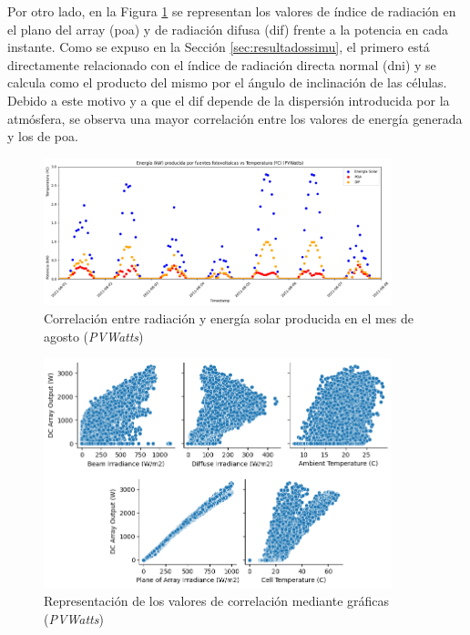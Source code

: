 Por otro lado, en la Figura \ref{fig:energiavsrad} se representan los valores de índice de radiación en el plano del array (\gls{poa}) y de radiación difusa (\gls{dif}) frente a la potencia en cada instante. Como se expuso en la Sección \ref{sec:resultadossimu}, el primero está directamente relacionado con el índice de radiación directa normal (\gls{dni}) y se calcula como el producto del mismo por el ángulo de inclinación de las células. Debido a este motivo y a que el \gls{dif} depende de la dispersión introducida por la atmósfera, se observa una mayor correlación entre los valores de energía generada y los de \gls{poa}.

\vspace{3mm}

\begin{figure}[H]
  \centering
  \includegraphics[width=0.9\textwidth]{img/diseno/energiavsrad.png}
  \caption{Correlación entre radiación y energía solar producida en el mes de agosto (\textit{PVWatts})}
  \label{fig:energiavsrad}
\end{figure}

\begin{figure}[H]
  \centering
  \includegraphics[width=0.9\textwidth]{img/diseno/corrgraficas.png}
  \caption{Representación de los valores de correlación mediante gráficas (\textit{PVWatts})}
  \label{fig:corrgraficas}
\end{figure}

